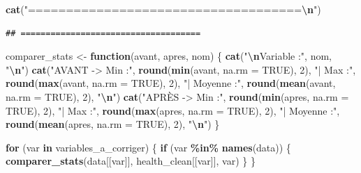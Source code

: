 \documentclass[
]{article}
\newenvironment{Shaded}{\begin{snugshade}}{\end{snugshade}}
\newcommand{\AttributeTok}[1]{\textcolor[rgb]{0.13,0.29,0.53}{#1}}
\newcommand{\ConstantTok}[1]{\textcolor[rgb]{0.56,0.35,0.01}{#1}}
\newcommand{\ControlFlowTok}[1]{\textcolor[rgb]{0.13,0.29,0.53}{\textbf{#1}}}
\newcommand{\DecValTok}[1]{\textcolor[rgb]{0.00,0.00,0.81}{#1}}
\newcommand{\FunctionTok}[1]{\textcolor[rgb]{0.13,0.29,0.53}{\textbf{#1}}}
\newcommand{\NormalTok}[1]{#1}
\newcommand{\OtherTok}[1]{\textcolor[rgb]{0.56,0.35,0.01}{#1}}
\newcommand{\SpecialCharTok}[1]{\textcolor[rgb]{0.81,0.36,0.00}{\textbf{#1}}}
\newcommand{\StringTok}[1]{\textcolor[rgb]{0.31,0.60,0.02}{#1}}
\begin{document}
\begin{Shaded}
\begin{Highlighting}[]
\FunctionTok{cat}\NormalTok{(}\StringTok{"====================================}\SpecialCharTok{\textbackslash{}n}\StringTok{"}\NormalTok{)}
\end{Highlighting}
\end{Shaded}

\begin{verbatim}
## ====================================
\end{verbatim}

\begin{Shaded}
\begin{Highlighting}[]
\NormalTok{comparer\_stats }\OtherTok{\textless{}{-}} \ControlFlowTok{function}\NormalTok{(avant, apres, nom) \{}
  \FunctionTok{cat}\NormalTok{(}\StringTok{"}\SpecialCharTok{\textbackslash{}n}\StringTok{Variable :"}\NormalTok{, nom, }\StringTok{"}\SpecialCharTok{\textbackslash{}n}\StringTok{"}\NormalTok{)}
  \FunctionTok{cat}\NormalTok{(}\StringTok{"AVANT {-}\textgreater{} Min :"}\NormalTok{, }\FunctionTok{round}\NormalTok{(}\FunctionTok{min}\NormalTok{(avant, }\AttributeTok{na.rm =} \ConstantTok{TRUE}\NormalTok{), }\DecValTok{2}\NormalTok{),}
      \StringTok{"| Max :"}\NormalTok{, }\FunctionTok{round}\NormalTok{(}\FunctionTok{max}\NormalTok{(avant, }\AttributeTok{na.rm =} \ConstantTok{TRUE}\NormalTok{), }\DecValTok{2}\NormalTok{),}
      \StringTok{"| Moyenne :"}\NormalTok{, }\FunctionTok{round}\NormalTok{(}\FunctionTok{mean}\NormalTok{(avant, }\AttributeTok{na.rm =} \ConstantTok{TRUE}\NormalTok{), }\DecValTok{2}\NormalTok{), }\StringTok{"}\SpecialCharTok{\textbackslash{}n}\StringTok{"}\NormalTok{)}
  \FunctionTok{cat}\NormalTok{(}\StringTok{"APRÈS {-}\textgreater{} Min :"}\NormalTok{, }\FunctionTok{round}\NormalTok{(}\FunctionTok{min}\NormalTok{(apres, }\AttributeTok{na.rm =} \ConstantTok{TRUE}\NormalTok{), }\DecValTok{2}\NormalTok{),}
      \StringTok{"| Max :"}\NormalTok{, }\FunctionTok{round}\NormalTok{(}\FunctionTok{max}\NormalTok{(apres, }\AttributeTok{na.rm =} \ConstantTok{TRUE}\NormalTok{), }\DecValTok{2}\NormalTok{),}
      \StringTok{"| Moyenne :"}\NormalTok{, }\FunctionTok{round}\NormalTok{(}\FunctionTok{mean}\NormalTok{(apres, }\AttributeTok{na.rm =} \ConstantTok{TRUE}\NormalTok{), }\DecValTok{2}\NormalTok{), }\StringTok{"}\SpecialCharTok{\textbackslash{}n}\StringTok{"}\NormalTok{)}
\NormalTok{\}}

\ControlFlowTok{for}\NormalTok{ (var }\ControlFlowTok{in}\NormalTok{ variables\_a\_corriger) \{}
  \ControlFlowTok{if}\NormalTok{ (var }\SpecialCharTok{\%in\%} \FunctionTok{names}\NormalTok{(data)) \{}
    \FunctionTok{comparer\_stats}\NormalTok{(data[[var]], health\_clean[[var]], var)}
\NormalTok{  \}}
\NormalTok{\}}
\end{Highlighting}
\end{Shaded}
\end{document}
